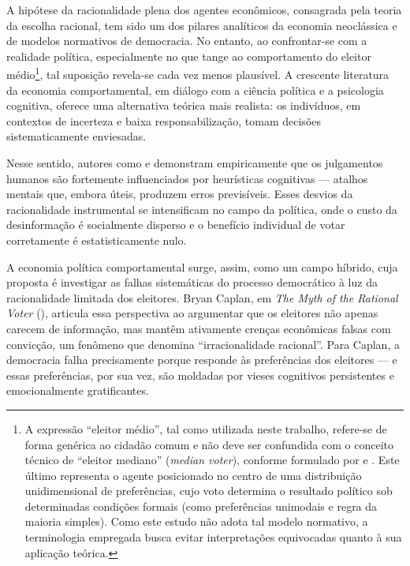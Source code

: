 A hipótese da racionalidade plena dos agentes econômicos, consagrada pela teoria da escolha racional, tem sido um dos pilares analíticos da economia neoclássica e de modelos normativos de democracia. No entanto, ao confrontar-se com a realidade política, especialmente no que tange ao comportamento do eleitor médio\footnote{A expressão “eleitor médio”, tal como utilizada neste trabalho, refere-se de forma genérica ao cidadão comum e não deve ser confundida com o conceito técnico de “eleitor mediano” (\textit{median voter}), conforme formulado por  e . Este último representa o agente posicionado no centro de uma distribuição unidimensional de preferências, cujo voto determina o resultado político sob determinadas condições formais (como preferências unimodais e regra da maioria simples). Como este estudo não adota tal modelo normativo, a terminologia empregada busca evitar interpretações equivocadas quanto à sua aplicação teórica.}, tal suposição revela-se cada vez menos plausível. A crescente literatura da economia comportamental, em diálogo com a ciência política e a psicologia cognitiva, oferece uma alternativa teórica mais realista: os indivíduos, em contextos de incerteza e baixa responsabilização, tomam decisões sistematicamente enviesadas.

Nesse sentido, autores como  e  demonstram empiricamente que os julgamentos humanos são fortemente influenciados por heurísticas cognitivas — atalhos mentais que, embora úteis, produzem erros previsíveis. Esses desvios da racionalidade instrumental se intensificam no campo da política, onde o custo da desinformação é socialmente disperso e o benefício individual de votar corretamente é estatisticamente nulo.

A economia política comportamental surge, assim, como um campo híbrido, cuja proposta é investigar as falhas sistemáticas do processo democrático à luz da racionalidade limitada dos eleitores. Bryan Caplan, em \textit{The Myth of the Rational Voter} (\citeyear{The_Myth_of_the_Rational_Voter}), articula essa perspectiva ao argumentar que os eleitores não apenas carecem de informação, mas mantêm ativamente crenças econômicas falsas com convicção, um fenômeno que denomina ``irracionalidade racional''. Para Caplan, a democracia falha precisamente porque responde às preferências dos eleitores — e essas preferências, por sua vez, são moldadas por vieses cognitivos persistentes e emocionalmente gratificantes.

